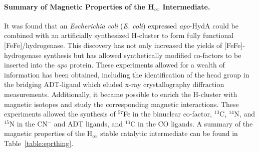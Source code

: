 \paragraph{Summary of Magnetic Properties of the H$_{ox}$ Intermediate.} It was found that an {\em Escherichia coli} ({\em E. coli}) expressed \textit{apo}-HydA could be combined with an artificially synthesized H-cluster to form fully functional [FeFe]\-/hydrogenase. \cite{EsselbornArtificial, BirrellArtificial} This discovery has not only increased the yields of [FeFe]-hydrogenase synthesis but has allowed synthetically modified co-factors to be inserted into the \textit{apo} protein. These experiments allowed for a wealth of information has been obtained, including the identification of the head group in the bridging ADT-ligand which eluded x-ray crystallography diffraction measurements. \cite{AdamskaBridgingAmine} Additionally, it became possible to enrich the H-cluster with magnetic isotopes and study the corresponding magnetic interactions. These experiments allowed the synthesis of $^{57}$Fe in the binuclear  co-factor, $^{13}$C, $^{14}$N, and $^{15}$N in the CN$^-$ and ADT ligands, and $^{13}$C in the CO ligands. A summary of the magnetic properties of the H$_{ox}$ stable catalytic intermediate can be found in Table~\ref{table:eprthing}. 

